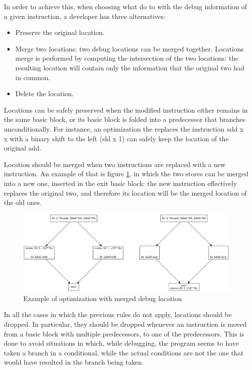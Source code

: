 In order to achieve this, when choosing what do to with the debug information of a given instruction, a developer has three alternatives:
\begin{itemize}
\item Preserve the original location.
\item Merge two locations: two debug locations can be merged together. Locations merge is performed by computing the intersection of the two locations: the resulting location will contain only the information that the original two had in common.
\item Delete the location.
\end{itemize}
Locations can be safely preserved when the modified instruction either remains in the same basic block, or its basic block is folded into a predecessor that branches unconditionally. For instance, an optimization the replaces the instruction {\selectfont add x x} with a binary shift to the left ({\selectfont shl x 1}) can safely keep the location of the original add. \par 
Location should be merged when two instructions are replaced with a new instruction. An example of that is figure \ref{fig:merge}, in which the two stores can be merged into a new one, inserted in the exit basic block: the new instruction effectively replaces the original two, and therefore its location will be the merged location of the old ones. \par
\begin{figure}
\centering
\includegraphics[scale=0.3]{chapter-2/merge.png}
\caption{Example of optimization with merged debug location}
\label{fig:merge}
\end{figure}
In all the cases in which the previous rules do not apply, locations should be dropped. In particular, they should be dropped whenever an instruction is moved from a basic block with multiple predecessors, to one of the predecessors. This is done to avoid situations in which, while debugging, the program seems to have taken a branch in a conditional, while the actual conditions are not the one that would have resulted in the branch being taken. \par 
